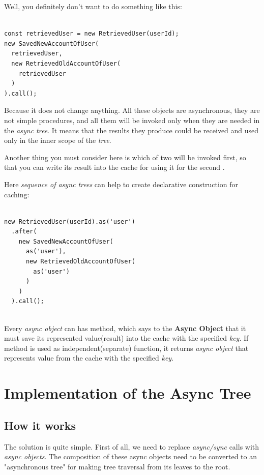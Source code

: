 \documentclass{article}
\newcommand{\cit}[1]{{\fontfamily{qcr}\selectfont{\textit{\textcolor{superdarkgray}{#1}}}}}
\begin{document}
\newpage

Well, you definitely don't want to do something like this:

\begin{lstlisting}

const retrievedUser = new RetrievedUser(userId);
new SavedNewAccountOfUser(
  retrievedUser,
  new RetrievedOldAccountOfUser(
    retrievedUser
  )
).call();

\end{lstlisting}

Because it does not change anything. All these objects are asynchronous, they are not simple procedures, and all them will be invoked only when they are needed in the \textit{async tree}. It means that the results they produce could be received and used only in the inner scope of the \textit{tree}.

Another thing you must consider here is which of two \cit{RetrievedUser} will be invoked first, so that you can write its result into the cache for using it for the second \cit{RetrievedUser}.

Here \textit{sequence of async trees} can help to create declarative construction for caching:

\begin{lstlisting}

new RetrievedUser(userId).as('user')
  .after(
    new SavedNewAccountOfUser(
      as('user'),
      new RetrievedOldAccountOfUser(
        as('user')
      )
    )
  ).call();
  
\end{lstlisting}

Every \textit{async object} can has \cit{as(key)} method, which says to the \textbf{Async Object} that it must save its represented value(result) into the cache with the specified \textit{key}. If \cit{as(key)} method is used as independent(separate) function, it returns \textit{async object} that represents value from the cache with the specified \textit{key}.

\section{Implementation of the Async Tree}

\subsection{How it works}

The solution is quite simple. First of all, we need to replace \textit{async/sync} calls with \textit{async objects}. The composition of these async objects need to be converted to an "asynchronous tree" for making tree traversal from its leaves to the root.
\end{document}
